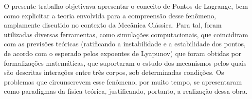 O presente trabalho objetivava apresentar o conceito de Pontos de Lagrange, bem como explicitar a teoria envolvida para a compreensão desse fenômeno, amplamente discutido no contexto da Mecânica Clássica. Para tal, foram utilizadas diversas ferramentas, como simulações computacionais, que coincidiram com as previsões teóricas (ratificando a instabilidade e a estabilidade dos pontos, de acordo com o esperado pelos expoentes de Lyapunov) que foram obtidas por formalizações matemáticas, que suportaram o estudo dos mecanismos pelos quais são descritas interações entre três corpos, sob determinadas condições. Os problemas que circunscrevem esse fenômeno, por muito tempo, se apresentaram como  paradigmas da física teórica, justificando, portanto, a realização dessa obra.
